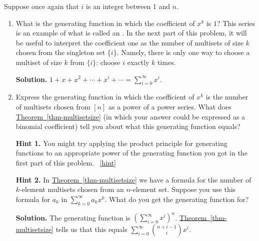 \documentclass{book}
\begin{document}
\setcounter{project}{250}
\addtocounter{project}{-1}
\begin{activity}[]\label{activity-243}
\hypertarget{p-1345}{}%
Suppose once again that \(i\) is an integer between 1 and \(n\).%
\begin{enumerate}[font=\bfseries,label=(\alph*),ref=\alph*]
\item\label{task-245} \hypertarget{p-1346}{}%
What is the generating function in which the coefficient of \(x^k\) is \(1\)? This series is an example of what is called an . In the next part of this problem, it will be useful to interpret the coefficient one as the number of multisets of size \(k\) chosen from the singleton set \(\{i\}\). Namely, there is only one way to choose a multiset of size \(k\) from \(\{i\}\): choose \(i\) exactly \(k\) times.%
\par\smallskip%
\noindent\textbf{Solution.}\hypertarget{solution-170}{}\quad%
\hypertarget{p-1347}{}%
\(1+x+x^2+\cdots+x^i+\cdots=\sum_{i=0}^\infty x^i\).%
\item\label{task-246} \hypertarget{p-1348}{}%
Express the generating function in which the coefficient of \(x^k\) is the number of multisets chosen from \([n]\) as a power of a power series.  What does \hyperref[thm-multisetsize]{Theorem~\ref{thm-multisetsize}} (in which your answer could be expressed as a binomial coefficient) tell you about what this generating function equals?%
\par\smallskip%
\noindent\textbf{Hint 1.}\hypertarget{hint-159}{}\quad%
\hypertarget{p-1349}{}%
You might try applying the product principle for generating functions to an appropriate power of the generating function you got in the first part of this problem.%
~\hfill{\tiny\hyperlink{a-250.b}{[hint]}\hypertarget{q-250.b}{}}\par\smallskip%
\noindent\textbf{Hint 2.}\hypertarget{hint-160}{}\quad%
\hypertarget{p-1350}{}%
In \hyperref[thm-multisetsize]{Theorem~\ref{thm-multisetsize}} we have a formula for the number of \(k\)-element multisets chosen from an \(n\)-element set. Suppose you use this formula for \(a_k\) in \(\sum_{k=0}^\infty a_kx^k\). What do you get the generating function for?%
\par\smallskip%
\noindent\textbf{Solution.}\hypertarget{solution-171}{}\quad%
\hypertarget{p-1351}{}%
The generating function is \(\left(\sum_{i=0}^\infty x^i\right)^n\).  \hyperref[thm-multisetsize]{Theorem~\ref{thm-multisetsize}} tells us that this equals \(\sum_{i=0}^\infty\binom{n+i-1}{i}x^i\).%
\end{enumerate}
\end{activity}
\end{document}
